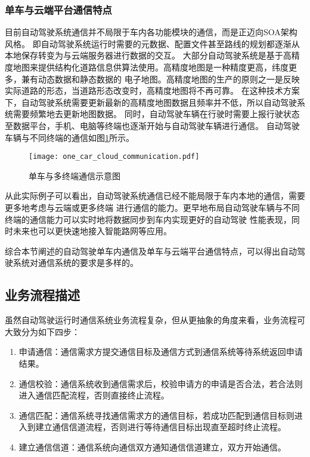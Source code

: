 \subsubsection{单车与云端平台通信特点}
目前自动驾驶系统通信并不局限于车内各功能模块的通信，而是正迈向SOA架构风格。
即自动驾驶系统运行时需要的元数据、配置文件甚至路线的规划都逐渐从本地保存转变为与云端服务器进行数据的交互。
大部分自动驾驶系统是基于高精度地图来提供结构化道路信息供算法使用。高精度地图是一种精度更高，纬度更多，兼有动态数据和静态数据的
电子地图。高精度地图的生产的原则之一是反映实际道路的形态，当道路形态改变时，高精度地图将不再可靠。
在这种技术方案下，自动驾驶系统需要更新最新的高精度地图数据且频率并不低，所以自动驾驶系统需要频繁地去更新地图数据。
同时，自动驾驶车辆在行驶时需要上报行驶状态至数据平台，手机、电脑等终端也逐渐开始与自动驾驶车辆进行通信。
自动驾驶车辆与不同终端的通信如图\ref{one_car_cloud_communication}所示。
\begin{figure}[htb]
  \centering
  \texttt{[image: one\_car\_cloud\_communication.pdf]}
  \caption{单车与多终端通信示意图}
  \label{one_car_cloud_communication}
\end{figure}
从此实际例子可以看出，自动驾驶系统通信已经不能局限于车内本地的通信，需要更多地考虑与云端或更多终端
进行通信的能力。更早地布局自动驾驶车辆与不同终端的通信能力可以实时地将数据同步到车内实现更好的自动驾驶
性能表现，同时未来也可以更快速地接入智能路网等应用。

综合本节阐述的自动驾驶单车内通信及单车与云端平台通信特点，可以得出自动驾驶系统对通信系统的要求是多样的。


\subsection{业务流程描述}
虽然自动驾驶运行时通信系统业务流程复杂，但从更抽象的角度来看，业务流程可大致分为如下四步：
\begin{enumerate}
  \item 申请通信：通信需求方提交通信目标及通信方式到通信系统等待系统返回申请结果。
  \item 通信校验：通信系统收到通信需求后，校验申请方的申请是否合法，若合法则进入通信匹配流程，否则直接终止流程。
  \item 通信匹配：通信系统寻找通信需求方的通信目标，若成功匹配到通信目标则进入到建立通信信道流程，否则进行等待通信目标出现直至超时终止流程。
  \item 建立通信信道：通信系统向通信双方通知通信信道建立，双方开始通信。
\end{enumerate}

